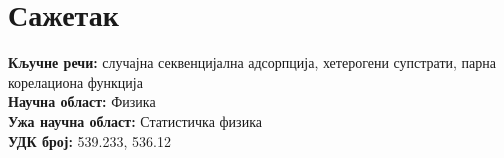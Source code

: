 \normalsize


\sffamily
{}\selectfont

\chapter*{Сажетак}





\noindent
\textbf{Кључне речи:} случајна секвенцијална адсорпција, хетерогени супстрати,
парна корелациона функција\\
\textbf{Научна област:} Физика \\
\textbf{Ужа научна област:} Статистичка физика \\
\textbf{УДК број:} 539.233, 536.12


\pagebreak
